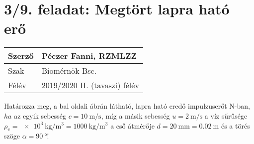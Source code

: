 
\section*{3/9. feladat: Megtört lapra ható erő}
\begin{tabular}{ | p{2cm} | p{14cm} | } 
	\hline 
	Szerző & Péczer Fanni, RZMLZZ \\
	\hline
	Szak & Biomérnök Bsc. \\
	\hline	Félév & 2019/2020 II. (tavaszi) félév  \\
	\hline
\end{tabular}
\vspace{0.5cm}

\noindent Határozza meg, a bal oldali ábrán látható,
lapra ható eredő impulzuserőt N-ban, $ha$
az egyik sebesség $c=\SI{10}{\meter\per\second}$, míg a másik sebesség $u=\SI{2}{\meter\per\second}$	a víz sűrűsége $\rho_v=\SI{e3}{\kilo\gram\per\meter\cubed}=\SI{1000}{\kilo\gram\per\meter\cubed}$	a cső átmérője $d=\SI{20}{\milli\meter}=\SI{0,02}{\meter}$ és a törés szöge	$\alpha=\SI{90}{\degree}$!

